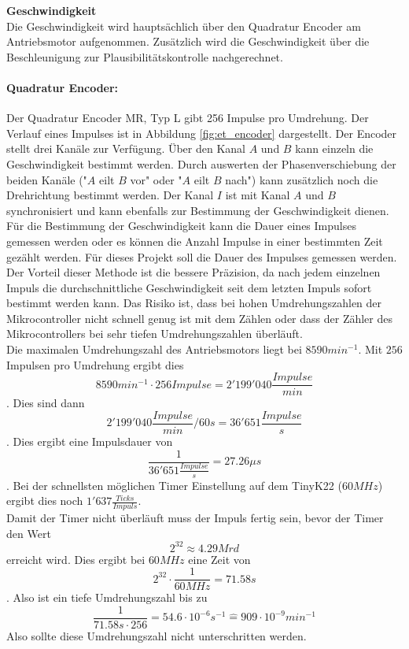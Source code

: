 \documentclass[../../main.tex]{subfiles}
\begin{document}
    \textbf{Geschwindigkeit}\\ \label{et_geschwindigkeit}
    Die Geschwindigkeit wird hauptsächlich über den Quadratur Encoder am Antriebsmotor aufgenommen. Zusätzlich wird die Geschwindigkeit über die Beschleunigung zur Plausibilitätskontrolle nachgerechnet.

    \paragraph{Quadratur Encoder:} Der Quadratur Encoder MR, Typ L gibt 256 Impulse pro Umdrehung. Der Verlauf eines Impulses ist in Abbildung \ref{fig:et_encoder} dargestellt. Der Encoder stellt drei Kanäle zur Verfügung. Über den Kanal $A$ und $B$ kann einzeln die Geschwindigkeit bestimmt werden. Durch auswerten der Phasenverschiebung der beiden Kanäle ("$A$ eilt $B$ vor" oder "$A$ eilt $B$ nach") kann zusätzlich noch die Drehrichtung bestimmt werden. Der Kanal $I$ ist mit Kanal $A$ und $B$ synchronisiert und kann ebenfalls zur Bestimmung der Geschwindigkeit dienen.\\
    Für die Bestimmung der Geschwindigkeit kann die Dauer eines Impulses gemessen werden oder es können die Anzahl Impulse in einer bestimmten Zeit gezählt werden. Für dieses Projekt soll die Dauer des Impulses gemessen werden. Der Vorteil dieser Methode ist die bessere Präzision, da nach jedem einzelnen Impuls die durchschnittliche Geschwindigkeit seit dem letzten Impuls sofort bestimmt werden kann. Das Risiko ist, dass bei hohen Umdrehungszahlen der Mikrocontroller nicht schnell genug ist mit dem Zählen oder dass der Zähler des Mikrocontrollers bei sehr tiefen Umdrehungszahlen überläuft.\\
    Die maximalen Umdrehungszahl des Antriebsmotors liegt bei $8590 min^{-1}$. Mit $256$ Impulsen pro Umdrehung ergibt dies $$8590 min^{-1} \cdot 256 Impulse = 2'199'040 \frac{Impulse}{min}$$.
    Dies sind dann $$ 2'199'040 \frac{Impulse}{min} / 60s = 36'651 \frac{Impulse}{s} $$.
    Dies ergibt eine Impulsdauer von $$\frac{1}{36'651 \frac{Impulse}{s}} = 27.26\mu s$$. Bei der schnellsten möglichen Timer Einstellung auf dem TinyK22 ($60MHz$) ergibt dies noch $1'637 \frac{Ticks}{Impuls}$.\\
    Damit der Timer nicht überläuft muss der Impuls fertig sein, bevor der Timer den Wert $$2^{32} \approx 4.29 Mrd$$ erreicht wird. Dies ergibt bei $60MHz$ eine Zeit von $$2^{32} \cdot \frac{1}{60MHz} = 71.58s$$. Also ist ein tiefe Umdrehungszahl bis zu $$\frac{1}{71.58s \cdot 256} = 54.6 \cdot 10^{-6} s^{-1} \hat{=} 909 \cdot 10^{-9} min^{-1}$$
    Also sollte diese Umdrehungszahl nicht unterschritten werden. 
    
\end{document}
